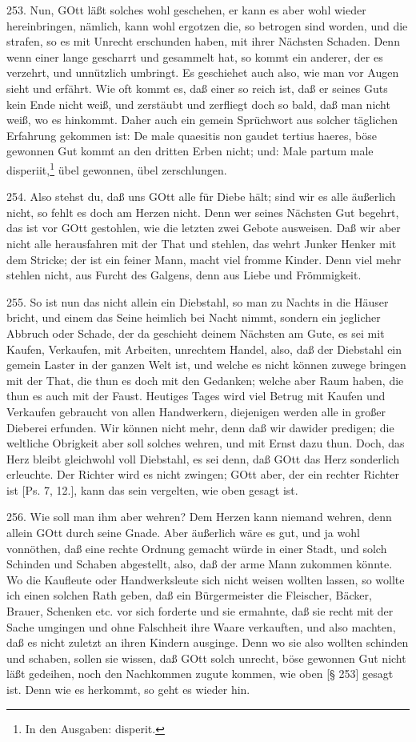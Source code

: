 253. Nun, GOtt läßt solches wohl geschehen, er kann es aber wohl wieder hereinbringen, nämlich, kann wohl ergotzen die, so betrogen sind worden, und die strafen, so es mit Unrecht erschunden haben, mit ihrer Nächsten Schaden. Denn wenn einer lange gescharrt und gesammelt hat, so kommt ein anderer, der es verzehrt, und unnützlich umbringt. Es geschiehet auch also, wie man vor Augen sieht und erfährt. Wie oft kommt es, daß einer so reich ist, daß er seines Guts kein Ende nicht weiß, und zerstäubt und zerfliegt doch so bald, daß man nicht weiß, wo es hinkommt. Daher auch ein gemein Sprüchwort aus solcher täglichen Erfahrung gekommen ist: De male quaesitis non gaudet tertius haeres, böse gewonnen Gut kommt an den dritten Erben nicht; und: Male partum male disperiit,\footnote{In den Ausgaben: disperit.} übel gewonnen, übel zerschlungen.

254. Also stehst du, daß uns GOtt alle für Diebe hält; sind wir es alle äußerlich nicht, so fehlt es doch am Herzen nicht. Denn wer seines Nächsten Gut begehrt, das ist vor GOtt gestohlen, wie die letzten zwei Gebote ausweisen. Daß wir aber nicht alle herausfahren mit der That und stehlen, das wehrt Junker Henker mit dem Stricke; der ist ein feiner Mann, macht viel fromme Kinder. Denn viel mehr stehlen nicht, aus Furcht des Galgens, denn aus Liebe und Frömmigkeit.

255. So ist nun das nicht allein ein Diebstahl, so man zu Nachts in die Häuser bricht, und einem das Seine heimlich bei Nacht nimmt, sondern ein jeglicher Abbruch oder Schade, der da geschieht deinem Nächsten am Gute, es sei mit Kaufen, Verkaufen, mit Arbeiten, unrechtem Handel, also, daß der Diebstahl ein gemein Laster in der ganzen Welt ist, und welche es nicht können zuwege bringen mit der That, die thun es doch mit den Gedanken; welche aber Raum haben, die thun es auch mit der Faust. Heutiges Tages wird viel Betrug mit Kaufen und Verkaufen gebraucht von allen Handwerkern, diejenigen werden alle in großer Dieberei erfunden. Wir können nicht mehr, denn daß wir dawider predigen; die weltliche Obrigkeit aber soll solches wehren, und mit Ernst dazu thun. Doch, das Herz bleibt gleichwohl voll Diebstahl, es sei denn, daß GOtt das Herz sonderlich erleuchte. Der Richter wird es nicht zwingen; GOtt aber, der
ein rechter Richter ist [Ps. 7, 12.], kann das sein vergelten, wie oben gesagt ist.

256. Wie soll man ihm aber wehren? Dem Herzen kann niemand wehren, denn allein GOtt durch seine Gnade. Aber äußerlich wäre es gut, und ja wohl vonnöthen, daß eine rechte Ordnung gemacht würde in einer Stadt, und solch Schinden und Schaben abgestellt, also, daß der arme Mann zukommen könnte. Wo die Kaufleute oder Handwerksleute sich nicht weisen wollten lassen, so wollte ich einen solchen Rath geben, daß ein Bürgermeister die Fleischer, Bäcker, Brauer, Schenken etc. vor sich forderte und sie ermahnte, daß sie recht mit der Sache umgingen und ohne Falschheit ihre Waare verkauften, und also machten, daß es nicht zuletzt an ihren Kindern ausginge. Denn wo sie also wollten schinden und schaben, sollen sie wissen, daß GOtt solch unrecht, böse gewonnen Gut nicht läßt gedeihen, noch den Nachkommen zugute kommen, wie oben [§ 253] gesagt ist. Denn wie es herkommt, so geht es wieder hin.

